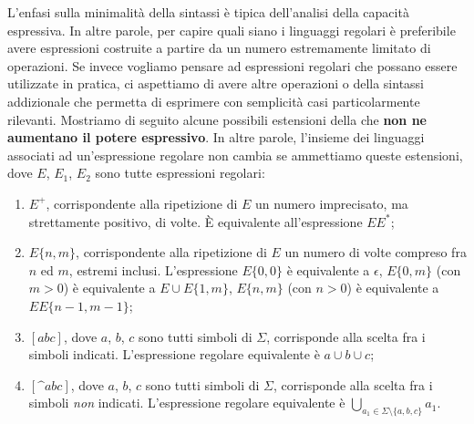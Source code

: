 L'enfasi sulla minimalità della sintassi è tipica dell'analisi della capacità espressiva.
In altre parole, per capire quali siano i linguaggi regolari è preferibile avere espressioni costruite a partire da un
numero estremamente limitato di operazioni.
Se invece vogliamo pensare ad espressioni regolari che possano essere utilizzate in pratica, ci aspettiamo di avere
altre operazioni o della sintassi addizionale che permetta di esprimere con semplicità casi particolarmente rilevanti.
Mostriamo di seguito alcune possibili estensioni della  che \textbf{non ne aumentano il potere espressivo}.
In altre parole, l'insieme dei linguaggi associati ad un'espressione regolare non cambia se ammettiamo queste
estensioni, dove $E$, $E_1$, $E_2$ sono tutte espressioni regolari:

\begin{enumerate}
\item $E^{+}$, corrispondente  alla ripetizione di $E$ un numero imprecisato, ma strettamente positivo,  di volte.
È equivalente all'espressione $E E^{*}$;
\item $E\{n,m\}$, corrispondente  alla ripetizione di $E$ un numero di volte compreso fra $n$ ed $m$, estremi inclusi.
L'espressione $E\{0,0\}$ è equivalente a $\epsilon$, $E\{0,m\}$ (con $m>0$) è equivalente a $E \cup E\{1,m\}$,
	  $E\{n,m\}$ (con $n>0$) è equivalente a $E E\{n-1,m-1\}$;
\item $[abc]$, dove $a$, $b$, $c$ sono tutti simboli di $\Sigma$, corrisponde alla scelta fra i simboli indicati.
	  L'espressione regolare equivalente è $a\cup b\cup c$;
\item $[\^ abc]$, dove $a$, $b$, $c$ sono tutti simboli di $\Sigma$, corrisponde alla scelta fra i simboli \emph{non} indicati.
	  L'espressione regolare equivalente è $\bigcup_{a_{1}\in \Sigma \setminus \{a,b,c\}} a_{1}$.
\end{enumerate}



